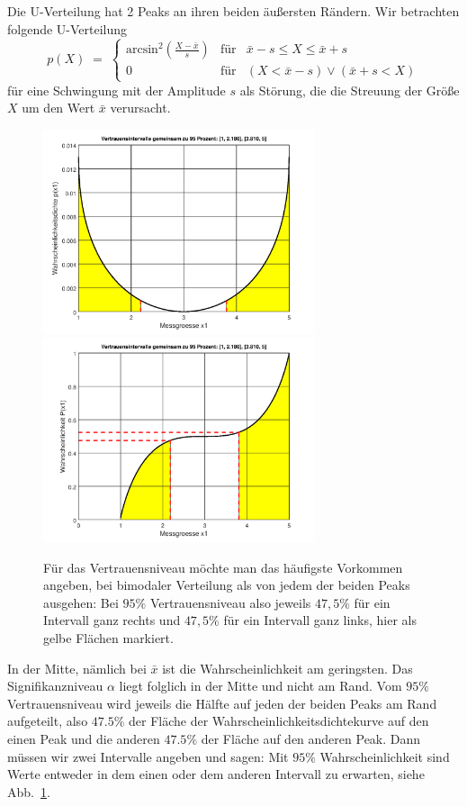 Die U-Verteilung hat 2 Peaks an ihren beiden äußersten Rändern.
Wir betrachten folgende U-Verteilung
\begin{equation}
p(X) \; = \; \left\{\begin{array}{lll}
\mathrm{arcsin}^2\left(\frac{X - \bar x}{s}\right) & \text{für} & \bar x - s  \leq X \leq \bar x + s\\
0 & \text{für} & (X < \bar x - s) \vee (\bar x + s < X)
\end{array}\right. 
\label{uverteilung}
\end{equation}
für eine Schwingung mit der Amplitude $s$ als Störung, die die Streuung der Größe $X$
um den Wert $\bar x$ verursacht.
\begin{figure}
	\begin{center}
 		\includegraphics[width=80mm]{10_vorlesung/media/pdf_Uverteilung_Vertrauensniveau.png}
 		\hspace{2mm}
	\includegraphics[width=80mm]{10_vorlesung/media/Pkum_Uverteilung_Vertrauensniveau.png}
		\caption{Für das Vertrauensniveau möchte man das häufigste Vorkommen angeben, bei
			bimodaler Verteilung als von jedem der beiden Peaks ausgehen: Bei $95 \%$
			Vertrauensniveau also jeweils $47,5 \%$ für ein Intervall ganz rechts und
			$47,5 \%$ für ein Intervall ganz links, hier als gelbe Flächen markiert.}
		\label{Uverteilungsquantile}
	\end{center}
\end{figure}
In der Mitte, nämlich bei $\bar x$ ist die Wahrscheinlichkeit am geringsten.
Das Signifikanzniveau $\alpha$ liegt folglich in der Mitte und nicht am Rand.
Vom $95 \%$ Vertrauensniveau wird jeweils die Hälfte auf jeden der beiden
Peaks am Rand aufgeteilt, also $47.5 \%$ der Fläche der 
Wahrscheinlichkeitsdichtekurve auf den einen Peak und die anderen $47.5 \%$ der Fläche auf den anderen
Peak. Dann müssen wir zwei Intervalle angeben und sagen: Mit $95 \%$ Wahrscheinlichkeit sind
Werte entweder in dem einen oder dem anderen Intervall zu erwarten, siehe Abb.~\ref{Uverteilungsquantile}.

